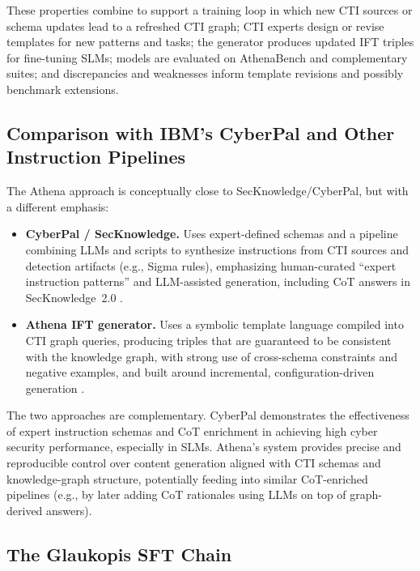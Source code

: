 \documentclass[unnumsec,webpdf,contemporary,large]{oup-authoring-template}
\theoremstyle{thmstyleone}
\theoremstyle{thmstyletwo}
\theoremstyle{thmstylethree}
\begin{document}
These properties combine to support a training loop in which new CTI sources or schema updates lead to a refreshed CTI graph; CTI experts design or revise templates for new patterns and tasks; the generator produces updated IFT triples for fine-tuning SLMs; models are evaluated on AthenaBench and complementary suites; and discrepancies and weaknesses inform template revisions and possibly benchmark extensions.

\subsection{Comparison with IBM's CyberPal and Other Instruction Pipelines}
\label{sec:glaukopis-vs-cyberpal}

The Athena approach is conceptually close to SecKnowledge/CyberPal, but with a different emphasis:

\begin{itemize}
  \item \textbf{CyberPal / SecKnowledge.} Uses expert-defined schemas and a pipeline combining LLMs and scripts to synthesize instructions from CTI sources and detection artifacts (e.g., Sigma rules), emphasizing human-curated ``expert instruction patterns'' and LLM-assisted generation, including CoT answers in SecKnowledge~2.0 \cite{levi2024cyberpal,levi2025toward}.
  \item \textbf{Athena IFT generator.} Uses a symbolic template language compiled into CTI graph queries, producing triples that are guaranteed to be consistent with the knowledge graph, with strong use of cross-schema constraints and negative examples, and built around incremental, configuration-driven generation \cite{cardei2025ift}.
\end{itemize}

The two approaches are complementary. CyberPal demonstrates the effectiveness of expert instruction schemas and CoT enrichment in achieving high cyber security performance, especially in SLMs. Athena's system provides precise and reproducible control over content generation aligned with CTI schemas and knowledge-graph structure, potentially feeding into similar CoT-enriched pipelines (e.g., by later adding CoT rationales using LLMs on top of graph-derived answers).

\subsection{The Glaukopis SFT Chain}
\label{sec:glaukopis-sft}
\end{document}
